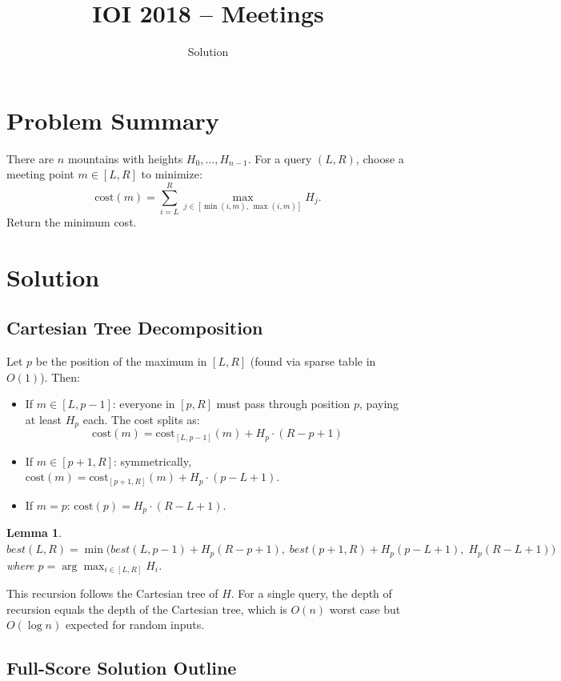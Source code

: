 \documentclass[11pt,a4paper]{article}
\title{IOI 2018 -- Meetings}
\author{Solution}
\date{}
\newtheorem{lemma}{Lemma}
\begin{document}
\maketitle

\section{Problem Summary}

There are $n$ mountains with heights $H_0, \ldots, H_{n-1}$. For a query $(L, R)$, choose a meeting point $m \in [L, R]$ to minimize:
\[
  \text{cost}(m) = \sum_{i=L}^{R} \max_{j \in [\min(i,m),\, \max(i,m)]} H_j.
\]
Return the minimum cost.

\section{Solution}

\subsection{Cartesian Tree Decomposition}

Let $p$ be the position of the maximum in $[L, R]$ (found via sparse table in $O(1)$). Then:

\begin{itemize}
  \item If $m \in [L, p-1]$: everyone in $[p, R]$ must pass through position $p$, paying at least $H_p$ each. The cost splits as:
  \[
    \text{cost}(m) = \text{cost}_{[L,p-1]}(m) + H_p \cdot (R - p + 1)
  \]
  \item If $m \in [p+1, R]$: symmetrically, $\text{cost}(m) = \text{cost}_{[p+1,R]}(m) + H_p \cdot (p - L + 1)$.
  \item If $m = p$: $\text{cost}(p) = H_p \cdot (R - L + 1)$.
\end{itemize}

\begin{lemma}
$\textit{best}(L, R) = \min\bigl(\textit{best}(L, p-1) + H_p(R-p+1),\; \textit{best}(p+1, R) + H_p(p-L+1),\; H_p(R-L+1)\bigr)$
where $p = \arg\max_{i \in [L,R]} H_i$.
\end{lemma}

This recursion follows the Cartesian tree of $H$. For a single query, the depth of recursion equals the depth of the Cartesian tree, which is $O(n)$ worst case but $O(\log n)$ expected for random inputs.

\subsection{Full-Score Solution Outline}
\end{document}
